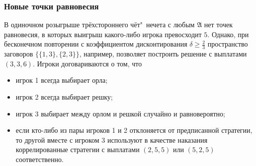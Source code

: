 \begin{frame}
	\frametitle{Новые точки равновесия}
	В одиночном розыгрыше трёхстороннего чёт"~нечета с любым $\mathfrak{A}$ нет точек равновесия, в которых выигрыш какого-либо игрока превосходит $5$. Однако, при бесконечном повторении с коэффициентом дисконтирования $\delta \ge \frac{2}{3}$ пространство заговоров $\{\{1, 3\}, \{2, 3\}\}$, например, позволяет построить решение с выплатами $(3, 3, 6)$. Игроки договариваются о том, что
	\begin{itemize}
		\item игрок 1 всегда выбирает орла;
		\item игрок 2 всегда выбирает решку;
		\item игрок 3 выбирает между орлом и решкой случайно и равновероятно;
		\item если кто-либо из пары игроков 1 и 2 отклоняется от предписанной стратегии, то другой вместе с игроком 3 используют в качестве наказания коррелированные стратегии с выплатами $(2, 5, 5)$ или $(5, 2, 5)$ соответственно.
	\end{itemize}
\end{frame}

%


